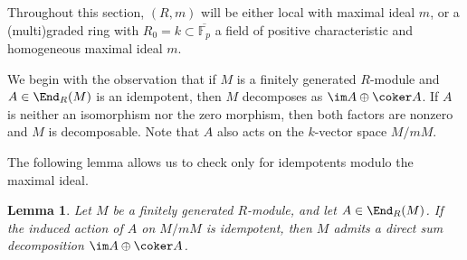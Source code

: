 \documentclass[12pt]{article}
\def\FF{\mathbb F}
\theoremstyle{theorem}
\numberwithin{thm}{section}
\newtheorem{lem}[thm]{Lemma}
\theoremstyle{definition}
\begin{document}
Throughout this section, $(R,m)$ will be either local with maximal ideal $m$, or a (multi)graded ring with $R_0 = k \subset \overline{\FF_p}$ a field of positive characteristic and homogeneous maximal ideal $m$.

We begin with the observation that if $M$ is a finitely generated $R$-module and $A\in\End_R(M)$ is an idempotent, then $M$ decomposes as $\im A \oplus \coker A$. If $A$ is neither an isomorphism nor the zero morphism, then both factors are nonzero and $M$ is decomposable. Note that $A$ also acts on the $k$-vector space $M/mM$.

The following lemma allows us to check only for idempotents modulo the maximal ideal.

\begin{lem}\label{lem:idemp}
  Let $M$ be a finitely generated $R$-module, and let $A\in\End_R(M)$. If the induced action of $A$ on $M/mM$ is idempotent, then $M$ admits a direct sum decomposition $\im A \oplus \coker A$.
\end{lem}
\end{document}
